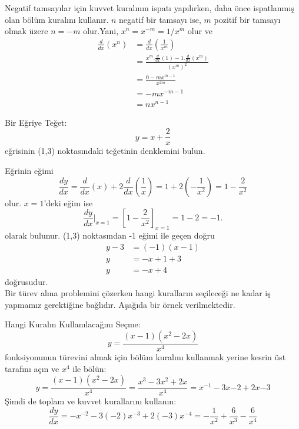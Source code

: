 Negatif tamsayılar için kuvvet kuralının ispatı yapılırken, daha önce ispatlanmış olan bölüm kuralını kullanır. $n$ negatif bir tamsayı ise, $m$ pozitif bir tamsayı olmak üzere $n=-m$ olur.Yani, $x^n=x^{-m}=1/x^m$ olur ve 
	\begin{equation*}
	\begin{split}
	\frac{d}{dx}(x^n)&=\frac{d}{dx}\left(\frac{1}{x^m}\right)\\
		&=\frac{x^m.\frac{d}{dx}(1)-1.\frac{d}{dx}(x^m)}{(x^m)^2}\\
		&=\frac{0-mx^{m-1}}{x^{2m}}\\
		&=-mx^{-m-1}\\
		&=nx^{n-1}
	\end{split}
	\end{equation*}
\begin{ornek} Bir Eğriye Teğet:
	\begin{equation*}
	y= x+\frac{2}{x}
	\end{equation*}
eğrisinin (1,3) noktasındaki teğetinin denklemini bulun.
\end{ornek}
\begin{cozum}
	Eğrinin eğimi
	\begin{equation*}
		\frac{dy}{dx}=\frac{d}{dx}(x)+2\frac{d}{dx}\left(\frac{1}{x}\right)=1+2\left(-\frac{1}{x^2}\right)=1-\frac{2}{x^2}
	\end{equation*}
olur. $x=1$'deki eğim ise
	\begin{equation*}
	\frac{dy}{dx}|_{x=1}=\left[1-\frac{2}{x^2}\right]_{x=1}=1-2=-1.
	\end{equation*}
olarak bulunur. (1,3) noktasından -1 eğimi ile geçen doğru
	\begin{equation*}
	\begin{split}
		y-3 &=(-1)(x-1)\\ y&=-x+1+3\\y&=-x+4
	\end{split}
	\end{equation*}
doğrusudur.\\
	Bir türev alma problemini çözerken hangi kuralların seçileceği ne kadar iş yapmamız gerektiğine bağlıdır. Aşağıda bir örnek verilmektedir.
\end{cozum}
\begin{ornek} Hangi Kuralın Kullanılacağını Seçme:
	\begin{equation*}
		y=\frac{(x-1)(x^2-2x)}{x^4}
	\end{equation*}
fonksiyonunun türevini almak için bölüm kuralını kullanmak yerine kesrin üst tarafını açın ve $x^4$ ile bölün:
	\begin{equation*}
		y=\frac{(x-1)(x^2-2x)}{x^4}=\frac{x^3-3x^2+2x}{x^4}=x^{-1}-3x{-2}+2x{-3}
	\end{equation*}
Şimdi de toplam ve kuvvet kurallarını kullanın:
	\begin{equation*}
	\frac{dy}{dx}=-x^{-2}-3(-2)x^{-3}+2(-3)x^{-4}=-\frac{1}{x^2}+\frac{6}{x^3}-\frac{6}{x^4}
	\end{equation*}
\end{ornek}

